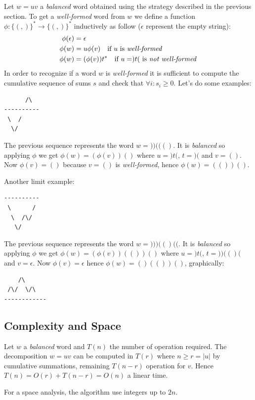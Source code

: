 Let $w=uv$ a \emph{balanced} word obtained using the strategy described
in the previous section. To get a \emph{well-formed} word from $w$ we
define a function $\phi:\{(,)\}^*\rightarrow \{(,)\}^*$ inductively as
follow ($\epsilon$ represent the empty string):
\begin{displaymath}
  \begin{split}
    \phi(\epsilon) &= \epsilon \\
    \phi(w) &= u \phi(v) \quad \text{if } u \text{ is
      \emph{well-formed}}\\
    \phi(w) &= ( \phi(v) )t^* \quad \text{if } u=)t( \text{ is
      \emph{not well-formed}} 
  \end{split}
\end{displaymath}
In order to recognize if a word $w$ is \emph{well-formed} it is
sufficient to compute the cumulative sequence of sums $s$ and check
that $\forall i:s_i \geq 0$. Let's do some examples:
\begin{verbatim}
      /\
----------
 \  /
  \/
\end{verbatim}
The previous sequence represents the word $w=))((()$. It is
\emph{balanced} so applying $\phi$ we get $\phi(w) = (\phi(v))()$
where $u=)t($, $t=)($ and $v=()$. Now $\phi(v) = ()$ because $v=()$ is
\emph{well-formed}, hence $\phi(w) = (())()$.

Another limit example:
\begin{verbatim}
----------
 \      /
  \  /\/
   \/
\end{verbatim}
The previous sequence represents the word $w=)))(()(($. It is
\emph{balanced} so applying $\phi$ we get $\phi(w) = (\phi(v))(())()$
where $u=)t($, $t=))(()($ and $v=\epsilon$. Now $\phi(v) =
\epsilon$ hence $\phi(w) = ()(())()$, graphically:
\begin{verbatim}
    /\
 /\/  \/\
------------
\end{verbatim}

\subsection{Complexity and Space}

Let $w$ a \emph{balanced} word and $T(n)$ the number of operation
required. The decomposition $w=uv$ can be computed in $T(r)$ where $n
\geq r = |u|$ by cumulative summations, remaining $T(n-r)$ operation
for $v$. Hence $T(n) = O(r) + T(n-r) = O(n)$ a linear time.

For a space analysis, the algorithm use integers up to $2n$.


